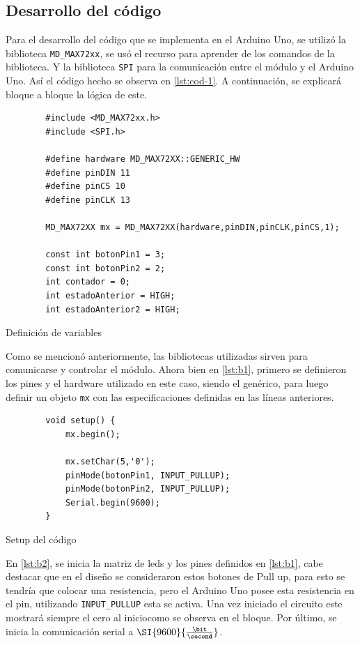 \subsection{Desarrollo del código}
Para el desarrollo del código que se implementa en el Arduino Uno, se utilizó la biblioteca \texttt{MD\_MAX72xx}, se usó
el recurso \cite{programarfacilMax7219} para aprender de los comandos de la biblioteca. Y la biblioteca \texttt{SPI} para 
la comunicación entre el módulo y el Arduino Uno. Así el código hecho se observa en \autoref{lst:cod-1}. A continuación, se explicará 
bloque a bloque la lógica de este.
\clearpage
\begin{listing}[H]
    \begin{verbatim}
        #include <MD_MAX72xx.h>
        #include <SPI.h>

        #define hardware MD_MAX72XX::GENERIC_HW
        #define pinDIN 11
        #define pinCS 10
        #define pinCLK 13

        MD_MAX72XX mx = MD_MAX72XX(hardware,pinDIN,pinCLK,pinCS,1);

        const int botonPin1 = 3;  
        const int botonPin2 = 2;
        int contador = 0;         
        int estadoAnterior = HIGH; 
        int estadoAnterior2 = HIGH;
    \end{verbatim}
    \caption{Definición de variables}
    \label{lst:b1}
\end{listing}

Como se mencionó anteriormente, las bibliotecas utilizadas sirven para comunicarse y controlar el módulo. Ahora bien en \autoref{lst:b1},
primero se definieron los pines y el hardware utilizado en este caso, siendo el genérico, para luego definir un objeto
\texttt{mx} con las especificaciones definidas en las líneas anteriores.   

\begin{listing}[H]
    \begin{verbatim}
        void setup() {
            mx.begin();

            mx.setChar(5,'0');
            pinMode(botonPin1, INPUT_PULLUP); 
            pinMode(botonPin2, INPUT_PULLUP);
            Serial.begin(9600);
        }
    \end{verbatim}
    \caption{Setup del código}
    \label{lst:b2}
\end{listing}
En \autoref{lst:b2}, se inicia la matriz de leds y los pines definidos en \autoref{lst:b1}, cabe destacar que en el diseño se consideraron estos botones
de Pull up, para esto se tendría que colocar una resistencia, pero el Arduino Uno posee esta resistencia en el pin, utilizando \texttt{INPUT\_PULLUP} esta se activa.
Una vez iniciado el circuito este mostrará siempre el cero al iniciocomo se observa en el bloque. Por último, se inicia la comunicación
serial a $\SI{9600}{\frac{\bit}{\second}}$.

